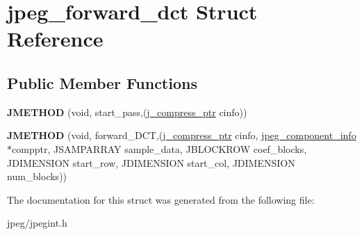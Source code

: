 \hypertarget{structjpeg__forward__dct}{}\section{jpeg\+\_\+forward\+\_\+dct Struct Reference}
\label{structjpeg__forward__dct}
\subsection*{Public Member Functions}
\begin{DoxyCompactItemize}
\item 
{\bfseries J\+M\+E\+T\+H\+OD} (void, start\+\_\+pass,(\hyperlink{structjpeg__compress__struct}{j\+\_\+compress\+\_\+ptr} cinfo))\hypertarget{structjpeg__forward__dct_a51b3b61e60becc93a36b41e26fd2c616}{}\label{structjpeg__forward__dct_a51b3b61e60becc93a36b41e26fd2c616}

\item 
{\bfseries J\+M\+E\+T\+H\+OD} (void, forward\+\_\+\+D\+CT,(\hyperlink{structjpeg__compress__struct}{j\+\_\+compress\+\_\+ptr} cinfo,               \hyperlink{structjpeg__component__info}{jpeg\+\_\+component\+\_\+info} $\ast$compptr,               J\+S\+A\+M\+P\+A\+R\+R\+AY sample\+\_\+data, J\+B\+L\+O\+C\+K\+R\+OW coef\+\_\+blocks,               J\+D\+I\+M\+E\+N\+S\+I\+ON start\+\_\+row, J\+D\+I\+M\+E\+N\+S\+I\+ON start\+\_\+col,               J\+D\+I\+M\+E\+N\+S\+I\+ON num\+\_\+blocks))\hypertarget{structjpeg__forward__dct_acb2dd4d92d90565667b37658f89f4e97}{}\label{structjpeg__forward__dct_acb2dd4d92d90565667b37658f89f4e97}

\end{DoxyCompactItemize}


The documentation for this struct was generated from the following file\+:\begin{DoxyCompactItemize}
\item 
jpeg/jpegint.\+h\end{DoxyCompactItemize}
